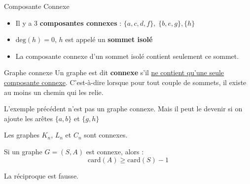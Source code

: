 \begin{Example}{Composante Connexe}{}
\begin{center}
\end{center}
\begin{itemize}
    \item Il y a 3 \textbf{composantes connexes} : $\{a,c,d,f\}, \; \{b,e,g\}, \{h\}$
    \item $\mathrm{deg} (h) =0$, $h$ est appelé un \textbf{sommet isolé}
    \item La composante connexe d'un sommet isolé contient seulement ce sommet.
\end{itemize}
\end{Example}
\begin{Definition}[colbacktitle=red!75!black]{Graphe connexe}{}
Un graphe est dit \textbf{connexe} s'il \underline{ne contient qu'une seule composante connexe}. C'est-à-dire lorsque pour tout couple de sommets, il existe au moins un chemin qui les relie.
\end{Definition}

\begin{Example}{}{}
    L'exemple précédent n'est pas un graphe connexe. Mais il peut le devenir si on ajoute les arêtes $\{a,b\}$ et $\{g,h\}$
\end{Example}

\begin{Example}{}{}
Les graphes $K_n$, $L_n$ et $C_n$ sont connexes.
\end{Example}


\begin{Prop}{}{} \label{Relation-connexité}
  Si un graphe $G= (S,A)$ est connexe, alors :
  \[
    \boxed{\mathrm{card} (A) \ge  \mathrm{card} (S) - 1 }
  \]

  La réciproque est fausse.

  \end{Prop}


